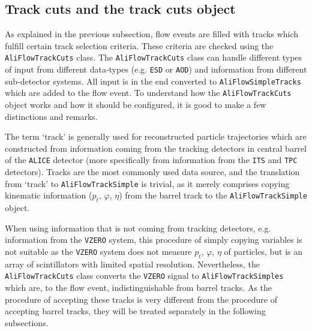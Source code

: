\documentclass[a4paper]{book}
\numberwithin{equation}{subsection}
\begin{document}
\subsection{Track cuts and the track cuts object}
As explained in the previous subsection, flow events are filled with tracks which fulfill certain track selection criteria. These criteria are checked using the \texttt{AliFlowTrackCuts} class. The \texttt{AliFlowTrackCuts} class can handle different types of input from different data-types (e.g. \texttt{ESD} or \texttt{AOD}) and information from different sub-detector systems. All input is in the end converted to \texttt{AliFlowSimpleTracks} which are added to the flow event. To understand how the \texttt{AliFlowTrackCuts} object works and how it should be configured, it is good to make a few distinctions and remarks. 

The term `track' is generally used for reconstructed particle trajectories which are constructed from information coming from the tracking detectors in central barrel of the \texttt{ALICE} detector (more specifically from information from the \texttt{ITS} and \texttt{TPC} detectors). Tracks are the most commonly used data source, and the translation from `track' to \texttt{AliFlowTrackSimple} is trivial, as it merely comprises copying  kinematic information ($p_t$, $\varphi$, $\eta$) from the barrel track to the \texttt{AliFlowTrackSimple} object. 

When using information that is not coming from tracking detectors, e.g. information from the \texttt{VZERO} system, this procedure of simply copying variables is not suitable as the \texttt{VZERO} system does not measure $p_t$, $\varphi$, $\eta$ of particles, but is an array of scintillators with limited spatial resolution. Nevertheless, the \texttt{AliFlowTrackCuts} class converts the \texttt{VZERO} signal to \texttt{AliFlowTrackSimples} which are, to the flow event, indistinguishable from barrel tracks. As the procedure of accepting these tracks is very different from the procedure of accepting barrel tracks, they will be treated separately in the following subsections. 
\end{document}
